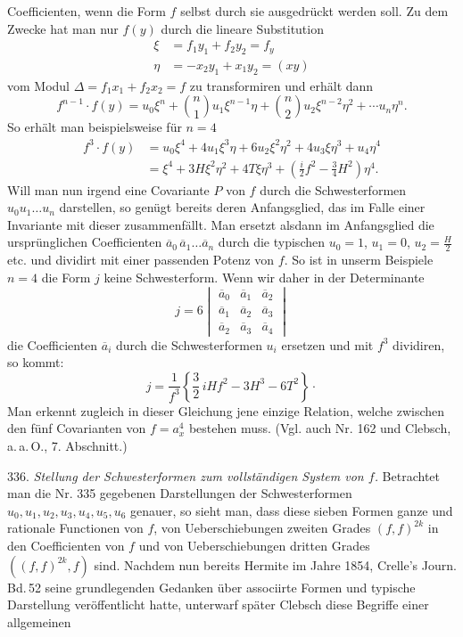 Coefficienten, wenn die Form $f$ selbst durch sie ausgedrückt werden
soll. Zu dem Zwecke hat man nur $f(y)$ durch die lineare Substitution
\[
\begin{aligned}
\xi &= f_1y_1+f_2y_2 = f_y\\
\eta &= -x_2y_1+x_1y_2 = (xy)
\end{aligned}
\]
vom Modul $\Delta = f_1x_1+f_2x_2=f$ zu transformiren und erhält dann
\[
f^{n-1}\cdot f(y) = u_0\xi^n+\binom{n}{1}u_1\xi^{n-1}\eta+\binom{n}{2}u_2\xi^{n-2}\eta^2+\cdots u_n\eta^n.
\]
So erhält man beispielsweise für $n=4$
\[
\begin{aligned}
f^3\cdot f(y) &= u_0\xi^4+4u_1\xi^3\eta+6u_2\xi^2\eta^2+4u_3\xi\eta^3+u_4\eta^4\\
&= \xi^4+3H\xi^2\eta^2+4T\xi\eta^3+\left(\frac{i}{2}f^2-\frac{3}{4}H^2\right)\eta^4.
\end{aligned}
\]
Will man nun irgend eine Covariante $P$ von $f$ durch die
Schwesterformen $u_0u_1\dots u_n$ darstellen, so genügt bereits deren
Anfangsglied, das im Falle einer Invariante mit dieser zusammenfällt.
Man ersetzt alsdann im Anfangsglied die ursprünglichen Coefficienten
$\overline{a}_0\,\overline{a}_1\dots\overline{a}_n$ durch die typischen $u_0=1$, $u_1=0$,
$u_2=\frac{H}{2}$ etc. und dividirt mit einer passenden Potenz von $f$.
So ist in unserm Beispiele $n=4$ die Form $j$ keine Schwesterform.
Wenn wir daher in der Determinante
\[
j = 6\begin{vmatrix} \overline{a}_0 & \overline{a}_1 & \overline{a}_2 \\ \overline{a}_1 & \overline{a}_2 & \overline{a}_3 \\ \overline{a}_2 & \overline{a}_3 & \overline{a}_4 \end{vmatrix}
\]
die Coefficienten $\overline{a}_i$ durch die Schwesterformen $u_i$ ersetzen und
mit $f^3$ dividiren, so kommt:
\[
j = \frac{1}{f^3}\left\{\frac{3}{2}\,iHf^2 - 3H^3 - 6T^2\right\}\cdot
\]
Man erkennt zugleich in dieser Gleichung jene einzige Relation, welche
zwischen den fünf Covarianten von $f=a_x^4$ bestehen muss. (Vgl. auch
Nr. 162 und Clebsch, a.\,a.\,O., 7. Abschnitt.)

336. \textit{Stellung der Schwesterformen zum vollständigen System von $f$.}
Betrachtet man die Nr. 335 gegebenen Darstellungen der Schwesterformen
$u_0, u_1, u_2, u_3, u_4, u_5, u_6$ genauer, so sieht man, dass diese sieben
Formen ganze und rationale Functionen von $f$, von Ueberschiebungen
zweiten Grades $(f,f)^{2k}$ in den Coefficienten von $f$ und von
Ueberschiebungen dritten Grades $((f,f)^{2k},f)$ sind. Nachdem nun bereits
Hermite im Jahre 1854, Crelle's Journ. Bd.\,52 seine grundlegenden
Gedanken über associirte Formen und typische Darstellung
veröffentlicht hatte, unterwarf später Clebsch diese Begriffe einer
allgemeinen


